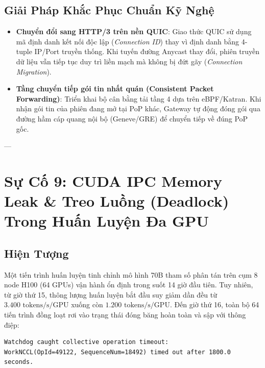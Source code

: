\subsection{Giải Pháp Khắc Phục Chuẩn Kỹ Nghệ}
\begin{itemize}
  \item \textbf{Chuyển đổi sang HTTP/3 trên nền QUIC}: Giao thức QUIC sử dụng mã định danh kết nối độc lập (\textit{Connection ID}) thay vì định danh bằng 4-tuple IP/Port truyền thống. Khi tuyến đường Anycast thay đổi, phiên truyền dữ liệu vẫn tiếp tục duy trì liền mạch mà không bị đứt gãy (\textit{Connection Migration}).
  \item \textbf{Tầng chuyển tiếp gói tin nhất quán (Consistent Packet Forwarding)}: Triển khai bộ cân bằng tải tầng 4 dựa trên eBPF/Katran. Khi nhận gói tin của phiên đang mở tại PoP khác, Gateway tự động đóng gói qua đường hầm cáp quang nội bộ (Geneve/GRE) để chuyển tiếp về đúng PoP gốc.
\end{itemize}

---

\section{Sự Cố 9: CUDA IPC Memory Leak \& Treo Luồng (Deadlock) Trong Huấn Luyện Đa GPU}
\label{sec:postmortem-cuda-ipc-leak}

\subsection{Hiện Tượng}
Một tiến trình huấn luyện tinh chỉnh mô hình 70B tham số phân tán trên cụm 8 node H100 (64 GPUs) vận hành ổn định trong suốt 14 giờ đầu tiên.
Tuy nhiên, từ giờ thứ 15, thông lượng huấn luyện bắt đầu suy giảm dần đều từ $3.400\text{ tokens/s/GPU}$ xuống còn $1.200\text{ tokens/s/GPU}$.
Đến giờ thứ 16, toàn bộ 64 tiến trình đồng loạt rơi vào trạng thái đóng băng hoàn toàn và sập với thông điệp:
\begin{verbatim}
Watchdog caught collective operation timeout:
WorkNCCL(OpId=49122, SequenceNum=18492) timed out after 1800.0 seconds.
\end{verbatim}

